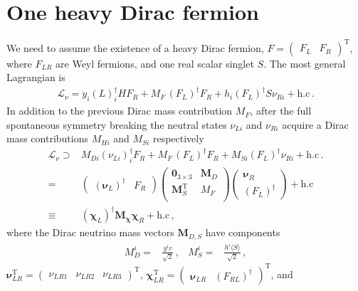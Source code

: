\section{One heavy Dirac fermion}
We need to assume the existence of a heavy Dirac fermion, $F=
\begin{pmatrix}
  F_L & F_R
\end{pmatrix}^{\operatorname{T}}$, where $F_{LR}$ are Weyl fermions, and one real scalar singlet $S$. The most general Lagrangian is
\begin{align}
  \mathcal{L}_{\nu}=y_i \left( L \right)^{\dagger}_i H  F_R 
  + M_F\, \left( F_L \right)^{\dagger}  F_R + h_i \left( F_L \right)^{\dagger} S \nu_{Ri}+   \text{h.c}\,.
\end{align}
In addition to the previous Dirac mass contribution $M_F$, after the full spontaneous symmetry  breaking the neutral states $\nu_{Li}$ and $\nu_{Ri}$  acquire a Dirac mass contributions $M_{Hi}$ and $M_{Si}$ respectively
\begin{align}
  \mathcal{L}_{\nu}\supset & M_{Di} \left( \nu_{Li} \right)^{\dagger}_i  F_R 
  + M_F\, \left( F_L \right)^{\dagger}  F_R + M_{Si} \left( F_L \right)^{\dagger}  \nu_{Ri}+   \text{h.c}\,. \nonumber\\
  =&\begin{pmatrix} \left( \boldsymbol{\nu}_{L} \right)^\dagger  & F_R  \end{pmatrix}
 \begin{pmatrix}
   \mathbf{0}_{3 \times 3} &            \boldsymbol{M}_D \\
   \boldsymbol{M}_S^{\operatorname{T}} & M_F \\
 \end{pmatrix}
\begin{pmatrix} \boldsymbol{\nu}_{R}  \\
    \left( F_L \right)^{\dagger}  \end{pmatrix}+\text{h.c} \nonumber\\
  \equiv& \left( \boldsymbol{\chi}_L \right)^\dagger \boldsymbol{M_{\chi}} \boldsymbol{\chi}_R+\text{h.c}\,,
\end{align}
where the Dirac neutrino mass vectors $\boldsymbol{M}_{D,S}$ have components
\begin{align}
  M_D^i=&\frac{y^i v}{\sqrt{2}}\,,&   M_S^i=&\frac{h^i \langle S\rangle}{\sqrt{2}}\,,
\end{align}
 $\boldsymbol{\nu}_{LR}^{\operatorname{T}}=
\begin{pmatrix}\nu_{LR1} & \nu_{LR2} & \nu_{LR3} \end{pmatrix}^{\operatorname{T}}$, $\boldsymbol{\chi}_{LR}^{\operatorname{T}}=\begin{pmatrix} \boldsymbol{\nu}_{LR}  & \left( F_{RL} \right)^{\dagger}  \end{pmatrix}^{\operatorname{T}}$, and
